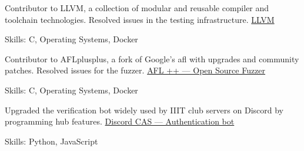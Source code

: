 
\begin{cventries}
  \cventry
    {Contributor to LLVM, a collection of modular and reusable compiler and toolchain technologies. Resolved issues in the testing infrastructure.} %
    {\href{}{LLVM}} %
    {} %
    {} %
    {
      \begin{cvitems} %
		\item {Skills: C, Operating Systems, Docker}
      \end{cvitems}
    }

  \cventry
    {Contributor to AFLplusplus, a fork of Google’s afl with upgrades and community patches. Resolved issues for the fuzzer.} %
    {\href{}{AFL ++ — Open Source Fuzzer}} %
    {} %
    {} %
    {
      \begin{cvitems} %
		\item {Skills: C, Operating Systems, Docker}
      \end{cvitems}
    }

    \cventry
    {Upgraded the verification bot widely used by IIIT club servers on Discord by programming hub features.} %
    {\href{}{Discord CAS — Authentication bot}} %
    {} %
    {} %
    {
      \begin{cvitems} %
		\item {Skills: Python, JavaScript}
      \end{cvitems}
    }

\end{cventries}
